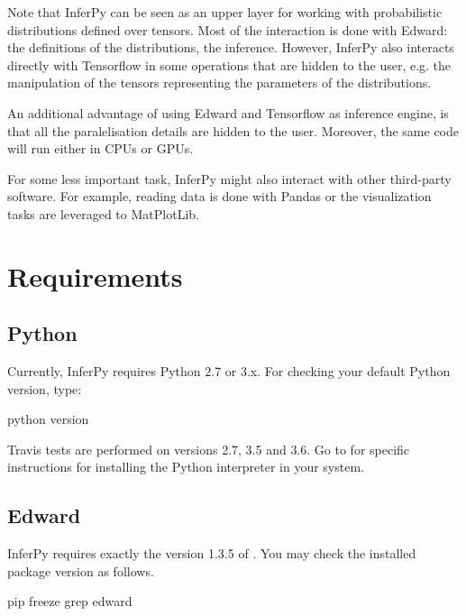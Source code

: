 \documentclass[letterpaper,10pt,english]{sphinxmanual}
\begin{document}
Note that InferPy can be seen as an upper layer for working with probabilistic distributions defined
over tensors. Most of the interaction is done with Edward:  the definitions of the distributions, the
inference. However, InferPy also interacts directly with Tensorflow in some operations that are hidden to
the user, e.g. the manipulation of the tensors representing the parameters of the distributions.

An additional advantage of using Edward and Tensorflow as inference engine, is that all the paralelisation details
are hidden to the user. Moreover, the same code will run either in CPUs or GPUs.

For some less important task, InferPy might also interact with other third-party software. For example, reading data is
done with Pandas or the visualization tasks are leveraged to MatPlotLib.


\chapter{Requirements}
\label{\detokenize{notes/requirements:requirements}}\label{\detokenize{notes/requirements::doc}}

\section{Python}
\label{\detokenize{notes/requirements:python}}
Currently, InferPy requires Python 2.7 or 3.x. For checking your default Python version, type:

\begin{sphinxVerbatim}[commandchars=\\\{\}]
\PYGZdl{} python \PYGZhy{}\PYGZhy{}version
\end{sphinxVerbatim}

Travis tests are performed on versions 2.7, 3.5 and 3.6. Go to 
for specific instructions for installing the Python interpreter in your system.


\section{Edward}
\label{\detokenize{notes/requirements:edward}}
InferPy requires exactly the version 1.3.5 of . You may check the installed
package version as follows.

\begin{sphinxVerbatim}[commandchars=\\\{\}]
\PYGZdl{} pip freeze \textbar{} grep edward
\end{sphinxVerbatim}
\end{document}
